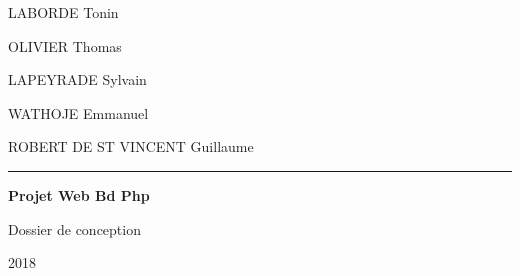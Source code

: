 \thispagestyle{empty}

\begin{titlepage}
  \selectfont
  \begin{flushright}\LARGE
    LABORDE Tonin

    OLIVIER Thomas

    LAPEYRADE Sylvain

    WATHOJE Emmanuel

    ROBERT DE ST VINCENT Guillaume
  \end{flushright}
  \hrule
  \begin{flushleft}\huge\bfseries
	Projet Web Bd Php
  \end{flushleft}


  \begin{center}\LARGE
    Dossier de conception
  \end{center}


  \begin{center}
    2018
  \end{center}
\end{titlepage}
